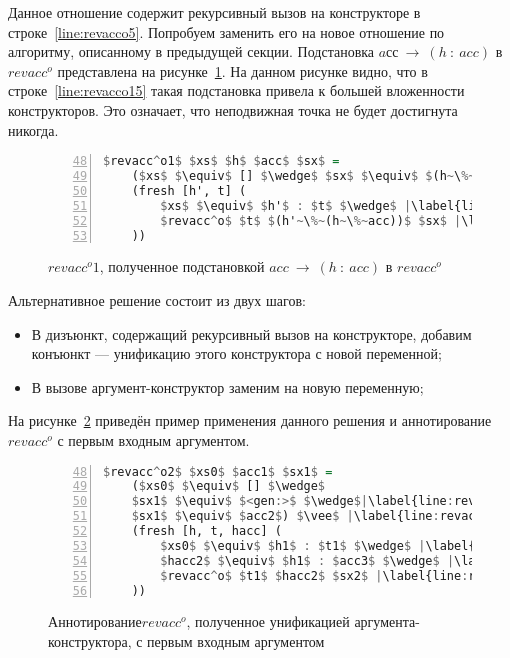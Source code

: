 Данное отношение содержит рекурсивный вызов на конструкторе в строке~\ref{line:revacco5}.
Попробуем заменить его на новое отношение по алгоритму, описанному в предыдущей секции.
Подстановка $aсс~\rightarrow~(h~:~acc)$ в $revacc^o$ представлена на рисунке~\ref{lst:revacco1}.
На данном рисунке видно, что в строке~\ref{line:revacco15} такая подстановка привела к большей вложенности конструкторов.
Это означает, что неподвижная точка не будет достигнута никогда.

\begin{figure}[h!]
  \begin{center}
  \begin{minipage}{0.4\textwidth}
  \begin{lstlisting}[language=Haskell, frame=single, numbers=left,numberstyle=\small, firstnumber=48, escapechar=|]
  $revacc^o1$ $xs$ $h$ $acc$ $sx$ =
    ($xs$ $\equiv$ [] $\wedge$ $sx$ $\equiv$ $(h~\%~acc)$) $\vee$ |\label{line:revacco12}|
    (fresh [h', t] (
        $xs$ $\equiv$ $h'$ : $t$ $\wedge$ |\label{line:revacco14}|
        $revacc^o$ $t$ $(h'~\%~(h~\%~acc))$ $sx$ |\label{line:revacco15}|
    ))
    \end{lstlisting}
  \end{minipage}
  \end{center}
  \caption{$revacc^o1$, полученное подстановкой $acc~\rightarrow~(h~:~acc)$ в $revacc^o$}
  \label{lst:revacco1}
\end{figure}

Альтернативное решение состоит из двух шагов:
\begin{itemize}
    \item В дизъюнкт, содержащий рекурсивный вызов на конструкторе, добавим конъюнкт --- унификацию этого конструктора с новой переменной;
    \item В вызове аргумент-конструктор заменим на новую переменную; 
\end{itemize}

На рисунке~\ref{lst:revacco2IOOANN} приведён пример применения данного решения и аннотирование $revacc^o$ с первым входным аргументом.

\begin{figure}[h!]
  \begin{center}
  \begin{minipage}{0.4\textwidth}
  \begin{lstlisting}[language=Haskell, frame=single, numbers=left,numberstyle=\small, firstnumber=48, escapechar=|]
  $revacc^o2$ $xs0$ $acc1$ $sx1$ =
    ($xs0$ $\equiv$ [] $\wedge$
    $sx1$ $\equiv$ $<gen:>$ $\wedge$|\label{line:revacco2IOOANN2}|
    $sx1$ $\equiv$ $acc2$) $\vee$ |\label{line:revacco2IOOANN3}|
    (fresh [h, t, hacc] (
        $xs0$ $\equiv$ $h1$ : $t1$ $\wedge$ |\label{line:revacco2IOOANN5}|
        $hacc2$ $\equiv$ $h1$ : $acc3$ $\wedge$ |\label{line:revacco2IOOANN6}|
        $revacc^o$ $t1$ $hacc2$ $sx2$ |\label{line:revacco2IOOANN7}|
    ))
    \end{lstlisting}
  \end{minipage}
  \end{center}
  \caption{$Аннотирование revacc^o$, полученное унификацией аргумента-конструктора, с первым входным аргументом}
  \label{lst:revacco2IOOANN}
\end{figure}

